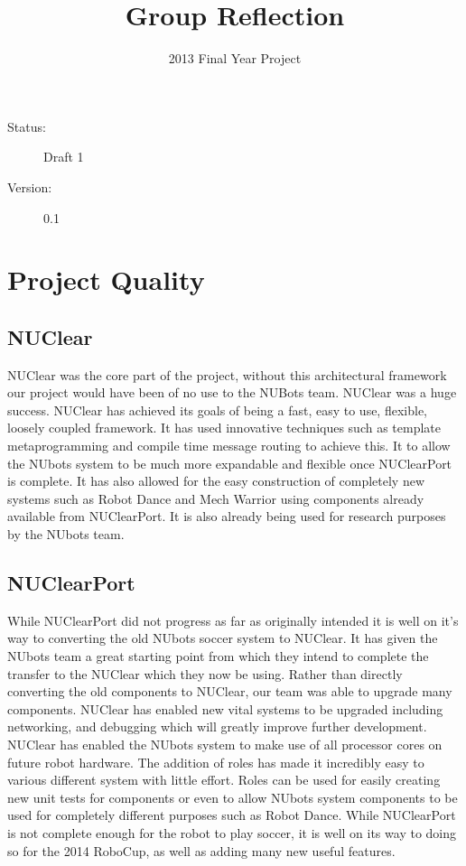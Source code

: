 \documentclass[english,12pt]{scrartcl}
\title{Group Reflection}
\author{2013 Final Year Project}
\begin{document}
	\maketitle
	\vfill
	{\large
		\begin{description}
			\item [Status:] Draft 1
			\item [Version:] 0.1
		\end{description}}

	\clearpage
	\tableofcontents
		
	\clearpage

\section{Project Quality}
	\subsection{NUClear}
		NUClear was the core part of the project, without this architectural framework our project would have been of no use to the NUBots team.
		NUClear was a huge success. NUClear has achieved its goals of being a fast, easy to use, flexible, loosely coupled framework.
		It has used innovative techniques such as template metaprogramming and compile time message routing to achieve this.
		It to allow the NUbots system to be much more expandable and flexible once NUClearPort is complete.
		It has also allowed for the easy construction of completely new systems such as Robot Dance and Mech Warrior using components already available from NUClearPort.
		It is also already being used for research purposes by the NUbots team.
	
	\subsection{NUClearPort}
		While NUClearPort did not progress as far as originally intended it is well on it's way to converting the old NUbots soccer system to NUClear.
		It has given the NUbots team a great starting point from which they intend to complete the transfer to the NUClear which they now be using.
		Rather than directly converting the old components to NUClear, our team was able to upgrade many components.
		NUClear has enabled new vital systems to be upgraded including networking, and debugging which will greatly improve further development.
		NUClear has enabled the NUbots system to make use of all processor cores on future robot hardware.
		The addition of roles has made it incredibly easy to various different system with little effort.
		Roles can be used for easily creating new unit tests for components or even to allow NUbots system components to be used for completely different purposes such as Robot Dance.
		While NUClearPort is not complete enough for the robot to play soccer, it is well on its way to doing so for the 2014 RoboCup, as well as adding many new useful features.
	
\end{document}
